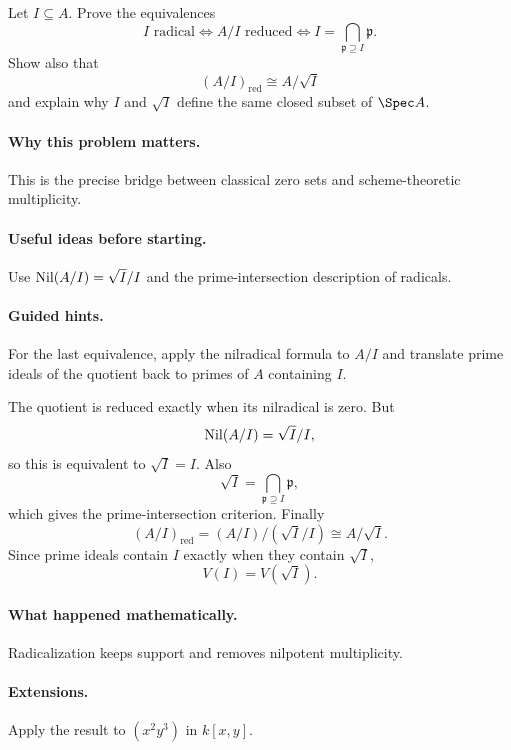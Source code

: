 \begin{problem}
Let $I\subseteq A$.  Prove the equivalences
\[
I\text{ radical}
\iff
A/I\text{ reduced}
\iff
I=\bigcap_{\mathfrak p\supseteq I}\mathfrak p.
\]
Show also that
\[
(A/I)_{\mathrm{red}}\cong A/\sqrt I
\]
and explain why $I$ and $\sqrt I$ define the same closed subset of $\Spec A$.
\end{problem}
\paragraph{Why this problem matters.}
This is the precise bridge between classical zero sets and scheme-theoretic multiplicity.
\paragraph{Useful ideas before starting.}
Use $\operatorname{Nil}(A/I)=\sqrt I/I$ and the prime-intersection description of radicals.
\paragraph{Guided hints.}
For the last equivalence, apply the nilradical formula to $A/I$ and translate prime ideals
of the quotient back to primes of $A$ containing $I$.
\begin{solution}
The quotient is reduced exactly when its nilradical is zero.  But
\[
\operatorname{Nil}(A/I)=\sqrt I/I,
\]
so this is equivalent to $\sqrt I=I$.  Also
\[
\sqrt I=\bigcap_{\mathfrak p\supseteq I}\mathfrak p,
\]
which gives the prime-intersection criterion.  Finally
\[
(A/I)_{\mathrm{red}}
=(A/I)/(\sqrt I/I)
\cong A/\sqrt I.
\]
Since prime ideals contain $I$ exactly when they contain $\sqrt I$,
\[
V(I)=V(\sqrt I).
\]
\end{solution}
\paragraph{What happened mathematically.}
Radicalization keeps support and removes nilpotent multiplicity.
\paragraph{Extensions.}
Apply the result to $(x^2y^3)$ in $k[x,y]$.
